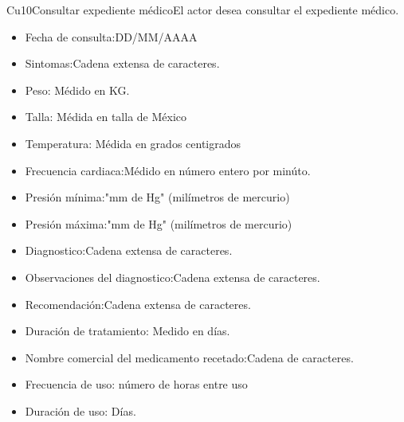 \begin{UseCase}{Cu10}{Consultar expediente médico}{El actor desea consultar el expediente médico.}
{\begin{itemize}
        \begin{itemize}
            \item Fecha de consulta:DD/MM/AAAA
            \item Sintomas:Cadena extensa de caracteres.
            \item Peso: Médido en KG.
            \item Talla: Médida en talla de México
            \item Temperatura: Médida en grados centigrados
            \item Frecuencia cardiaca:Médido en número entero por minúto.
            \item Presión mínima:"mm de Hg" (milímetros de mercurio)
            \item Presión máxima:"mm de Hg" (milímetros de mercurio) 
            \item Diagnostico:Cadena extensa de caracteres.
            \item Observaciones del diagnostico:Cadena extensa de caracteres.
            \item Recomendación:Cadena extensa de caracteres.
            \item Duración de tratamiento: Medido en días.
            \item Nombre comercial del medicamento recetado:Cadena de caracteres.
            \item Frecuencia de uso: número de horas entre uso 
            \item Duración de uso: Días.
        \end{itemize}
        \end{itemize}
    }
    
\end{UseCase}

